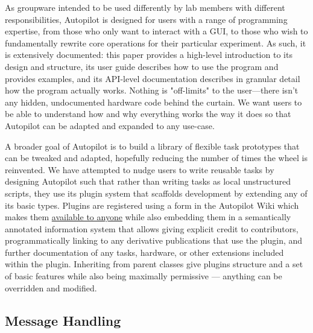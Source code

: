 As groupware intended to be used differently by lab members with different responsibilities, Autopilot is designed for users with a range of programming expertise, from those who only want to interact with a GUI, to those who wish to fundamentally rewrite core operations for their particular experiment. As such, it is extensively documented: this paper provides a high-level introduction to its design and structure, its user guide describes how to use the program and provides examples, and its API-level documentation describes in granular detail how the program actually works. Nothing is "off-limits" to the user---there isn't any hidden, undocumented hardware code behind the curtain. We want users to be able to understand how and why everything works the way it does so that Autopilot can be adapted and expanded to any use-case.

A broader goal of Autopilot is to build a library of flexible task prototypes that can be tweaked and adapted, hopefully reducing the number of times the wheel is reinvented. We have attempted to nudge users to write reusable tasks by designing Autopilot such that rather than writing tasks as local unstructured scripts, they use its plugin system that scaffolds development by extending any of its basic types. Plugins are registered using a form in the Autopilot Wiki which makes them \href{https://wiki.auto-pi-lot.com/index.php/Autopilot_Plugins}{available to anyone} while also embedding them in a semantically annotated information system that allows giving explicit credit to contributors, programmatically linking to any derivative publications that use the plugin, and further documentation of any tasks, hardware, or other extensions included within the plugin. Inheriting from parent classes give plugins structure and a set of basic features while also being maximally permissive --- anything can be overridden and modified.

\subsection{Message Handling}
\label{sec:message_handling}

